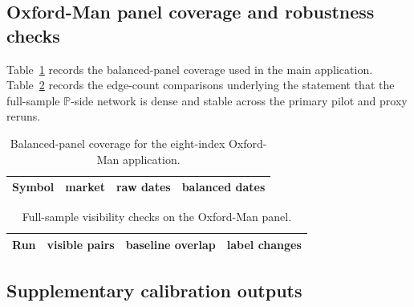 \documentclass[11pt,a4paper]{amsart}
\theoremstyle{plain}
\theoremstyle{definition}
\theoremstyle{remark}
\newcommand{\PP}{\mathbb{P}}
\begin{document}
\subsection{Oxford-Man panel coverage and robustness checks}

Table~\ref{tab:oxfordman-data-summary} records the balanced-panel coverage used in the main
application.  Table~\ref{tab:oxfordman-visibility-robustness} records the edge-count comparisons
underlying the statement that the full-sample \(\PP\)-side network is dense and
stable across the primary pilot and proxy reruns.

\begin{table}[htbp]
\centering
\caption{Balanced-panel coverage for the eight-index Oxford-Man application.}
\label{tab:oxfordman-data-summary}
\small
\begin{tabular}{llrr}
\toprule
Symbol & market & raw dates & balanced dates \\
\midrule

\end{tabular}
\end{table}

\begin{table}[htbp]
\centering
\caption{Full-sample visibility checks on the Oxford-Man panel.}
\label{tab:oxfordman-visibility-robustness}
\small
\begin{tabular}{lccc}
\toprule
Run & visible pairs & baseline overlap & label changes \\
\midrule

\end{tabular}
\end{table}

\subsection{Supplementary calibration outputs}
\end{document}

